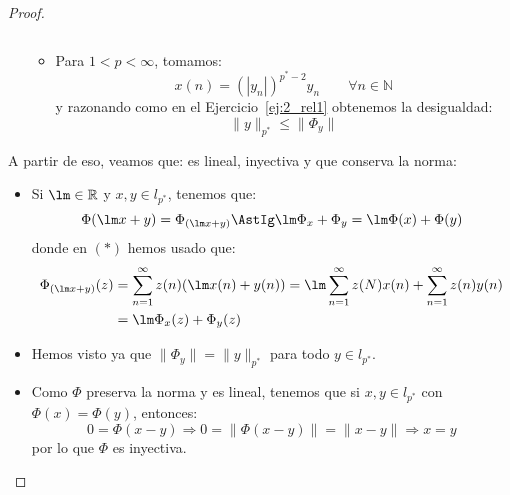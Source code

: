 \begin{prop}
\begin{proof}
\begin{itemize}
\begin{itemize}
\begin{equation*}
                    \end{equation*}
                \item Para $1<p<\infty$, tomamos:
                    \begin{equation*}
                        x(n) = {(|y_n|)}^{p^\ast-2}y_n \qquad \forall n\in \mathbb{N}
                    \end{equation*}
                    y razonando como en el Ejercicio~\ref{ej:2_rel1} obtenemos la desigualdad:
                    \begin{equation*}
                        \|y\|_{p^\ast} \leq \|\Phi_y\|
                    \end{equation*}
            \end{itemize}
    \end{itemize}
    A partir de eso, veamos que:
    es lineal, inyectiva y que conserva la norma:
    \begin{itemize}
        \item Si $\lm\in \mathbb{R}$ y $x,y\in l_{p^\ast}$, tenemos que:
            \begin{equation*}
                \Phi(\lm x + y) = \Phi_{(\lm x + y)} \AstIg \lm \Phi_x + \Phi_y = \lm\Phi(x) + \Phi(y)
            \end{equation*}
            donde en $(\ast)$ hemos usado que:
            \begin{align*}
                \Phi_{(\lm x + y)}(z) &= \sum_{n=1}^{\infty}z(n)(\lm x(n) + y(n)) = \lm \sum_{n=1}^{\infty}z(N)x(n) + \sum_{n=1}^{\infty}z(n)y(n) \\ &= \lm\Phi_x(z) + \Phi_y(z)
            \end{align*}
        \item Hemos visto ya que $\|\Phi_y\| = \|y\|_{p^\ast}$ para todo $y\in l_{p^\ast}$.
        \item Como $\Phi$ preserva la norma y es lineal, tenemos que si $x,y\in l_{p^\ast}$ con $\Phi(x) = \Phi(y)$, entonces:
            \begin{equation*}
                0 = \Phi(x-y) \Longrightarrow 0 = \|\Phi(x-y)\| = \|x-y\| \Longrightarrow x = y
            \end{equation*}
            por lo que $\Phi$ es inyectiva.
    \end{itemize}
    \end{proof}
\end{prop}

